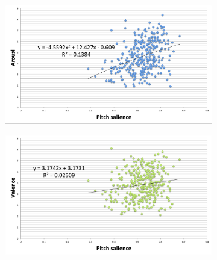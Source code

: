 \begin{figure}
 
         \centering
        \begin{subfigure}[b]{0.48\textwidth}
                \includegraphics[width=\textwidth]{Figures/pitchsalience-arousal}
			   \vspace{20pt}
        \end{subfigure}
        \begin{subfigure}[b]{0.48\textwidth}
                \includegraphics[width=\textwidth]{Figures/pitchsalience-valence}
                  \vspace{20pt}
        \end{subfigure}


\end{figure}
